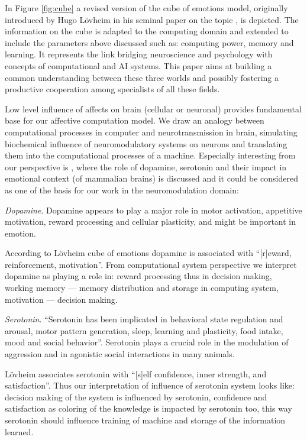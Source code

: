 \documentclass[procedia]{easychair}
\begin{document}
In Figure \ref{fig:cube} a revised version of the cube of emotions
model, originally introduced by Hugo L{\"o}vheim in his seminal paper on the topic \cite{lovheim2012}, is depicted.
The information on the cube is adapted to the computing domain and extended to include the parameters above discussed such as: computing power, memory and learning.
It represents the link bridging neuroscience and psychology with concepts of computational and AI systems.
This paper aims at building a common understanding between these three worlds and possibly fostering a productive cooperation among specialists of all these fields.

Low level influence of affects on brain (cellular or neuronal) provides fundamental base for our affective
computation model. We draw an analogy between computational processes in computer and neurotransmission in brain, simulating
biochemical influence of neuromodulatory systems on neurons and translating them into the computational processes
of a machine. Especially interesting from our perspective is \cite{fellous2004}, where the role of dopamine,
serotonin and their impact in emotional context (of mammalian brains) is discussed and it could be considered as
one of the basis for our work in the neuromodulation domain:

\textit{Dopamine}.
Dopamine appears to play a major role in motor activation, appetitive motivation, reward processing and cellular
 plasticity, and might be important in emotion.

According to L{\"o}vheim cube of emotions dopamine is associated with ``[r]eward, reinforcement, motivation''.
From computational system perspective we interpret dopamine as playing a role in: reward processing thus in
decision making, working memory --- memory distribution and storage in computing system, motivation --- decision making.

\textit{Serotonin}.
``Serotonin has been implicated in behavioral state regulation and arousal, motor pattern generation,
sleep, learning and plasticity, food intake, mood and social behavior''.
Serotonin plays a crucial role in the modulation of aggression and in agonistic social interactions in many animals.

L{\"o}vheim associates serotonin with ``[s]elf confidence, inner strength, and satisfaction''. Thus
our interpretation of influence of serotonin system looks like: decision making of the system is influenced by serotonin,
confidence and satisfaction as coloring of the knowledge is impacted by serotonin too, this way serotonin should influence
training of machine and storage of the information learned.
\end{document}
